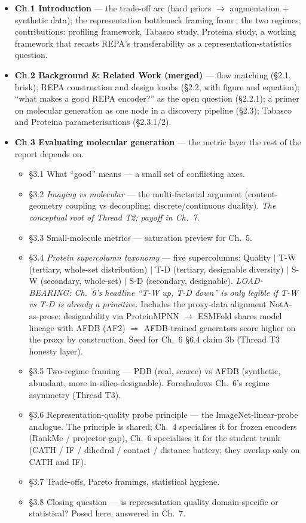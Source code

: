 \documentclass[11pt,a4paper]{article}
\begin{document}
\begin{itemize}[leftmargin=*,itemsep=2pt]
\item \textbf{Ch 1 Introduction} --- the trade-off arc (hard priors $\to$
augmentation + synthetic data); the representation bottleneck framing
from \cite{REPA}; the two regimes; contributions: profiling framework,
Tabasco study, Proteina study, a working framework that recasts REPA's
transferability as a representation-statistics question.

\item \textbf{Ch 2 Background \& Related Work (merged)} --- flow matching
(\S2.1, brisk); REPA construction and design knobs (\S2.2, with figure
and equation); ``what makes a good REPA encoder?'' as the open question
(\S2.2.1); a primer on molecular generation as one node in a discovery
pipeline (\S2.3); Tabasco and Proteina parameterisations (\S2.3.1/2).

\item \textbf{Ch 3 Evaluating molecular generation} --- the metric layer
the rest of the report depends on.
  \begin{itemize}[leftmargin=*,itemsep=0pt]
  \item \S3.1 What ``good'' means --- a small set of conflicting axes.
  \item \S3.2 \emph{Imaging vs molecular} --- the multi-factorial argument
  (content-geometry coupling vs decoupling; discrete/continuous duality).
  \emph{The conceptual root of Thread T2; payoff in Ch.~7.}
  \item \S3.3 Small-molecule metrics --- saturation preview for Ch.~5.
  \item \S3.4 \emph{Protein supercolumn taxonomy} --- five supercolumns:
  Quality $\mid$ T-W (tertiary, whole-set distribution) $\mid$ T-D (tertiary,
  designable diversity) $\mid$ S-W (secondary, whole-set) $\mid$ S-D
  (secondary, designable). \emph{LOAD-BEARING: Ch.~6's headline
  ``T-W up, T-D down'' is only legible if T-W vs T-D is already a
  primitive.} Includes the proxy-data alignment NotA-as-prose: designability
  via ProteinMPNN $\to$ ESMFold shares model lineage with AFDB (AF2)
  $\Rightarrow$ AFDB-trained generators score higher on the proxy by
  construction. Seed for Ch.~6 \S6.4 claim 3b (Thread T3 honesty layer).
  \item \S3.5 Two-regime framing --- PDB (real, scarce) vs AFDB (synthetic,
  abundant, more in-silico-designable). Foreshadows Ch.~6's regime
  asymmetry (Thread T3).
  \item \S3.6 Representation-quality probe principle --- the
  ImageNet-linear-probe analogue. The principle is shared; Ch.~4
  specialises it for frozen encoders (RankMe / projector-gap), Ch.~6
  specialises it for the student trunk (CATH / IF / dihedral / contact /
  distance battery; they overlap only on CATH and IF).
  \item \S3.7 Trade-offs, Pareto framings, statistical hygiene.
  \item \S3.8 Closing question --- is representation quality domain-specific
  or statistical? Posed here, answered in Ch.~7.
  \end{itemize}


\end{itemize}
\end{document}
